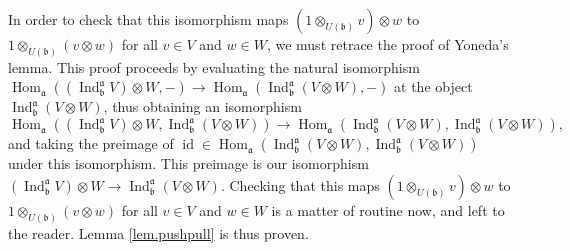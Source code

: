 \documentclass[etingof-lie.tex]{subfiles}
\begin{document}
In order to check that this isomorphism maps $\left(  1\otimes_{U\left(
\mathfrak{b}\right)  }v\right)  \otimes w$ to $1\otimes_{U\left(
\mathfrak{b}\right)  }\left(  v\otimes w\right)  $ for all $v\in V$ and $w\in
W$, we must retrace the proof of Yoneda's lemma. This proof proceeds by
evaluating the natural isomorphism $\operatorname*{Hom}\nolimits_{\mathfrak{a}%
}\left(  \left(  \operatorname*{Ind}\nolimits_{\mathfrak{b}}^{\mathfrak{a}%
}V\right)  \otimes W,-\right)  \rightarrow\operatorname*{Hom}%
\nolimits_{\mathfrak{a}}\left(  \operatorname*{Ind}\nolimits_{\mathfrak{b}%
}^{\mathfrak{a}}\left(  V\otimes W\right)  ,-\right)  $ at the object
$\operatorname*{Ind}\nolimits_{\mathfrak{b}}^{\mathfrak{a}}\left(  V\otimes
W\right)  $, thus obtaining an isomorphism%
\[
\operatorname*{Hom}\nolimits_{\mathfrak{a}}\left(  \left(  \operatorname*{Ind}%
\nolimits_{\mathfrak{b}}^{\mathfrak{a}}V\right)  \otimes W,\operatorname*{Ind}%
\nolimits_{\mathfrak{b}}^{\mathfrak{a}}\left(  V\otimes W\right)  \right)
\rightarrow\operatorname*{Hom}\nolimits_{\mathfrak{a}}\left(
\operatorname*{Ind}\nolimits_{\mathfrak{b}}^{\mathfrak{a}}\left(  V\otimes
W\right)  ,\operatorname*{Ind}\nolimits_{\mathfrak{b}}^{\mathfrak{a}}\left(
V\otimes W\right)  \right)  ,
\]
and taking the preimage of $\operatorname*{id}\in\operatorname*{Hom}%
\nolimits_{\mathfrak{a}}\left(  \operatorname*{Ind}\nolimits_{\mathfrak{b}%
}^{\mathfrak{a}}\left(  V\otimes W\right)  ,\operatorname*{Ind}%
\nolimits_{\mathfrak{b}}^{\mathfrak{a}}\left(  V\otimes W\right)  \right)  $
under this isomorphism. This preimage is our isomorphism $\left(
\operatorname*{Ind}\nolimits_{\mathfrak{b}}^{\mathfrak{a}}V\right)  \otimes
W\rightarrow\operatorname*{Ind}\nolimits_{\mathfrak{b}}^{\mathfrak{a}}\left(
V\otimes W\right)  $. Checking that this maps $\left(  1\otimes_{U\left(
\mathfrak{b}\right)  }v\right)  \otimes w$ to $1\otimes_{U\left(
\mathfrak{b}\right)  }\left(  v\otimes w\right)  $ for all $v\in V$ and $w\in
W$ is a matter of routine now, and left to the reader. Lemma
\ref{lem.pushpull} is thus proven.
\end{document}
